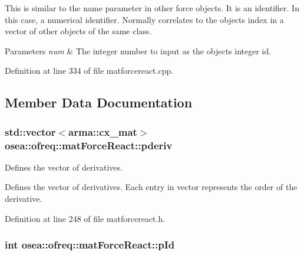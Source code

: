 This is similar to the name parameter in other force objects. It is an identifier. In this case, a numerical identifier. Normally correlates to the objects index in a vector of other objects of the same class. 
\begin{DoxyParams}{Parameters}
{\em num} & The integer number to input as the objects integer id. \\
\hline
\end{DoxyParams}


Definition at line 334 of file matforcereact.\-cpp.



\subsection{Member Data Documentation}
\hypertarget{classosea_1_1ofreq_1_1mat_force_react_a827cccb59204d98738a4d98b78942b45}{
\subsubsection[{pderiv}]{\setlength{\rightskip}{0pt plus 5cm}std\-::vector$<$arma\-::cx\-\_\-mat$>$ osea\-::ofreq\-::mat\-Force\-React\-::pderiv\hspace{0.3cm}{\ttfamily [protected]}}}\label{classosea_1_1ofreq_1_1mat_force_react_a827cccb59204d98738a4d98b78942b45}


Defines the vector of derivatives. 

Defines the vector of derivatives. Each entry in vector represents the order of the derivative. 

Definition at line 248 of file matforcereact.\-h.

\hypertarget{classosea_1_1ofreq_1_1mat_force_react_a890a6fbcf9900d4a37ff05533f350f50}{
\subsubsection[{p\-Id}]{\setlength{\rightskip}{0pt plus 5cm}int osea\-::ofreq\-::mat\-Force\-React\-::p\-Id\hspace{0.3cm}{\ttfamily [protected]}}}\label{classosea_1_1ofreq_1_1mat_force_react_a890a6fbcf9900d4a37ff05533f350f50}


